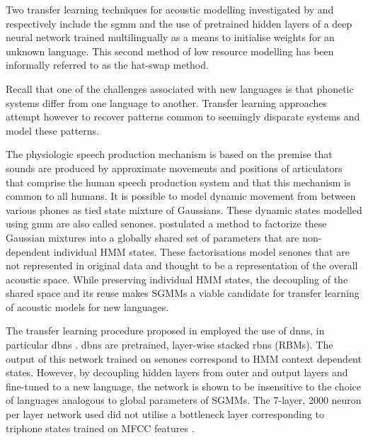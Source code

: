 Two transfer learning techniques for acoustic modelling investigated by \cite{povey2011subspace} and \cite{ghoshal2013multilingual} respectively include the \acrfull{sgmm} and the use of pretrained hidden layers of a deep neural network trained multilingually as a means to initialise weights for an unknown language.  This second method of low resource modelling has been informally referred to as the hat-swap method.

Recall that one of the challenges associated with new languages is that phonetic systems differ from one language to another.  Transfer learning approaches attempt however to recover patterns common to seemingly disparate systems and model these patterns.  

The physiologic speech production mechanism is based on the premise that sounds are produced by approximate movements and positions of articulators that comprise the human speech production system and that this mechanism is common to all humans.  It is possible to model dynamic movement from between various phones as tied state mixture of Gaussians. These dynamic states modelled using \acrfull{gmm} are also called senones. \cite{povey2011subspace} postulated a method to factorize these Gaussian mixtures into a globally shared set of parameters that are non-dependent individual HMM states.  These factorisations model senones that are not represented in original data and thought to be a representation of the overall acoustic space.  While preserving individual HMM states, the decoupling of the shared space and its reuse makes SGMMs a viable candidate for transfer learning of acoustic models for new languages.

The transfer learning procedure proposed in \cite{ghoshal2013multilingual} employed the use of \acrlong{dnns}, in particular \acrfull{dbn}s \citep{bengio2007greedy}.  \acrlong{dbn}s are pretrained, layer-wise  stacked \acrlong{rbn}s (RBMs)\citep{smolensky1986information}.  The output of this network trained on senones correspond to HMM context dependent states.  However, by decoupling hidden layers from outer and output layers and fine-tuned to a new language, the network is shown to be insensitive to the choice of languages analogous to global parameters of SGMMs. The 7-layer, 2000 neuron per layer network used did not utilise a bottleneck layer corresponding to triphone states trained on MFCC features \citep{grezl2008optimizing}.

